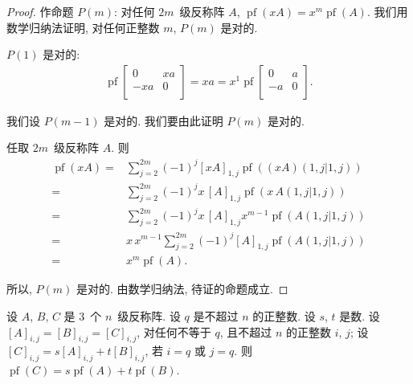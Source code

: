 \documentclass[../libro.tex]{subfiles}
\begin{document}
\begin{proof}
    作命题 \(P(m)\):
    对任何 \(2m\)~级反称阵 \(A\),
    \(\operatorname{pf} {(xA)}
    = x^m \operatorname{pf} {(A)}\).
    我们用数学归纳法证明,
    对任何正整数 \(m\), \(P(m)\) 是对的.

    \(P(1)\) 是对的:
    \begin{align*}
        \operatorname{pf} {
            \begin{bmatrix}
                0   & xa \\
                -xa & 0  \\
            \end{bmatrix}
        }
        = xa
        = x^1 \operatorname{pf} {
            \begin{bmatrix}
                0  & a \\
                -a & 0 \\
            \end{bmatrix}
        }.
    \end{align*}

    我们设 \(P(m-1)\) 是对的.
    我们要由此证明 \(P(m)\) 是对的.

    任取 \(2m\)~级反称阵 \(A\).
    则
    \begin{align*}
        \operatorname{pf} {(xA)}
        = {} &
        \sum_{j = 2}^{2m}
        {(-1)^{j} [xA]_{1,j}
        \operatorname{pf} {((xA)({1,j}|{1,j}))}}
        \\
        = {} &
        \sum_{j = 2}^{2m}
        {(-1)^{j} x\, [A]_{1,j}
        \operatorname{pf} {(x\,A({1,j}|{1,j}))}}
        \\
        = {} &
        \sum_{j = 2}^{2m}
        {(-1)^{j} x\, [A]_{1,j}
        x^{m-1} \operatorname{pf} {(A({1,j}|{1,j}))}}
        \\
        = {} &
        x\,x^{m-1}
        \sum_{j = 2}^{2m}
        {(-1)^{j} [A]_{1,j}
        \operatorname{pf} {(A({1,j}|{1,j}))}}
        \\
        = {} &
        x^m \operatorname{pf} {(A)}.
    \end{align*}

    所以, \(P(m)\) 是对的.
    由数学归纳法, 待证的命题成立.
\end{proof}

\begin{theorem}
    设 \(A\), \(B\), \(C\) 是 \(3\)~个 \(n\)~级反称阵.
    设 \(q\) 是不超过 \(n\) 的正整数.
    设 \(s\), \(t\) 是数.
    设 \([A]_{i,j} = [B]_{i,j} = [C]_{i,j}\),
    对任何不等于 \(q\), 且不超过 \(n\) 的正整数 \(i\), \(j\);
    设 \([C]_{i,j} = s[A]_{i,j} + t[B]_{i,j}\),
    若 \(i = q\) 或 \(j = q\).
    则
    \(
        \operatorname{pf} {(C)}
        = s \operatorname{pf} {(A)}
        + t \operatorname{pf} {(B)}
    \).
\end{theorem}
\end{document}
